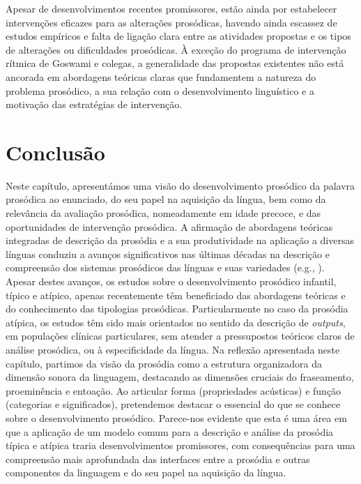 \documentclass[output=paper,colorlinks,citecolor=brown,booklanguage=portuguese]{langscibook}
\begin{document}
Apesar de desenvolvimentos recentes promissores, estão ainda por estabelecer intervenções eficazes para as alterações prosódicas, havendo ainda escassez de estudos empíricos e falta de ligação clara entre as atividades propostas e os tipos de alterações ou dificuldades prosódicas. À exceção do programa de intervenção rítmica de Goswami e colegas, a generalidade das propostas existentes não está ancorada em abordagens teóricas claras que fundamentem a natureza do problema prosódico, a sua relação com o desenvolvimento linguístico e a motivação das estratégias de intervenção.

\section{Conclusão}
\largerpage
Neste capítulo, apresentámos uma visão do desenvolvimento prosódico da palavra prosódica ao enunciado, do seu papel na aquisição da língua, bem como da relevância da avaliação prosódica, nomeadamente em idade precoce, e das oportunidades de intervenção prosódica. A afirmação de abordagens teóricas integradas de descrição da prosódia \citep{Nespor2007, Ladd2008} e a sua produtividade na aplicação a diversas línguas conduziu a avanços significativos nas últimas décadas na descrição e compreensão dos sistemas prosódicos das línguas e suas variedades (e.g., \citealp{Jun2005, Jun2014, Frota2015}). Apesar destes avanços, os estudos sobre o desenvolvimento prosódico infantil, típico e atípico, apenas recentemente têm beneficiado das abordagens teóricas e do conhecimento das tipologias prosódicas. Particularmente no caso da prosódia atípica, os estudos têm sido mais orientados no sentido da descrição de \emph{outputs}, em populações clínicas particulares, sem atender a pressupostos teóricos claros de análise prosódica, ou à especificidade da língua. Na reflexão apresentada neste capítulo, partimos da visão da prosódia como a estrutura organizadora da dimensão sonora da linguagem, destacando as dimensões cruciais do fraseamento, proeminência e entoação. Ao articular forma (propriedades acústicas) e função (categorias e significados), pretendemos destacar o essencial do que se conhece sobre o desenvolvimento prosódico. Parece-nos evidente que esta é uma área em que a aplicação de um modelo comum para a descrição e análise da prosódia típica e atípica traria desenvolvimentos promissores, com consequências para uma compreensão mais aprofundada das interfaces entre a prosódia e outras componentes da linguagem e do seu papel na aquisição da língua.
\end{document}
